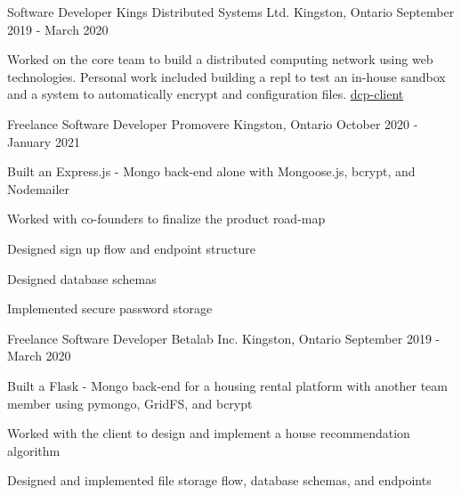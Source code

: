 

\begin{cventries}

  \cventry
    {Software Developer} %
    {Kings Distributed Systems Ltd.} %
    {Kingston, Ontario} %
    {September 2019 - March 2020} %
    {
      \begin{cvitems} %
        \item {Worked on the core team to build a distributed computing network using web technologies. Personal work included building a repl to test an in-house sandbox and a system to automatically encrypt and configuration files. \href{https://www.npmjs.com/package/dcp-client}{dcp-client}}
      \end{cvitems}
    }

  \cventry
    {Freelance Software Developer} %
    {Promovere} %
    {Kingston, Ontario} %
    {October 2020 - January 2021} %
    {
      \begin{cvitems} %
        \item {Built an Express.js - Mongo back-end alone with Mongoose.js, bcrypt, and Nodemailer}
        \item{Worked with co-founders to finalize the product road-map}
        \item{Designed sign up flow and endpoint structure}
        \item{Designed database schemas}
        \item{Implemented secure password storage}
      \end{cvitems}
    }

  \cventry
    {Freelance Software Developer} %
    {Betalab Inc.} %
    {Kingston, Ontario} %
    {September 2019 - March 2020} %
    {
      \begin{cvitems} %
        \item {Built a Flask - Mongo back-end for a housing rental platform with another team member using pymongo, GridFS, and bcrypt}
        \item{Worked with the client to design and implement a house recommendation algorithm}
        \item{Designed and implemented file storage flow, database schemas, and endpoints}
      \end{cvitems}
    }


\end{cventries}
